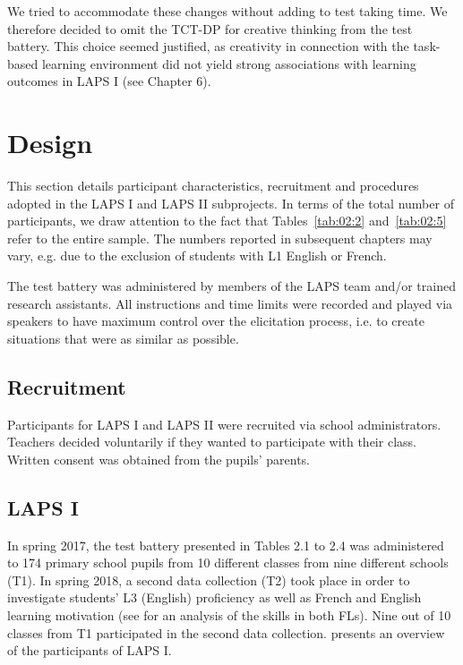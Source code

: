 \documentclass[output=paper]{langsci/langscibook}
\begin{document}
We tried to accommodate these changes without adding to test taking time. We therefore decided to omit the TCT-DP for creative thinking from the test battery. This choice seemed justified, as creativity in connection with the task-based learning environment did not yield strong associations with learning outcomes in LAPS I (see Chapter 6). 

\section{Design}\label{sec:02:4}

This section details participant characteristics, recruitment and procedures adopted in the LAPS I and LAPS II subprojects. In terms of the total number of participants, we draw attention to the fact that Tables~\ref{tab:02:2} and~\ref{tab:02:5} refer to the entire sample. The numbers reported in subsequent chapters may vary, e.g. due to the exclusion of students with L1 English or French. 

The test battery was administered by members of the LAPS team and/or trained research assistants. All instructions and time limits were recorded and played via speakers to have maximum control over the elicitation process, i.e. to create situations that were as similar as possible. 

 \subsection{Recruitment}


Participants for LAPS I and LAPS II were recruited via school administrators. Teachers decided voluntarily if they wanted to participate with their class. Written consent was obtained from the pupils’ parents. 

 \subsection{LAPS I}


In spring 2017, the test battery presented in Tables 2.1 to 2.4 was administered to 174 primary school pupils from 10 different classes from nine different schools (T1). In spring 2018, a second data collection (T2) took place in order to investigate students’ L3 (English) proficiency as well as French and English learning motivation (see \citealt{BertheleUdry2019} for an analysis of the skills in both FLs). Nine out of 10 classes from T1 participated in the second data collection.  presents an overview of the participants of LAPS I.
\end{document}
